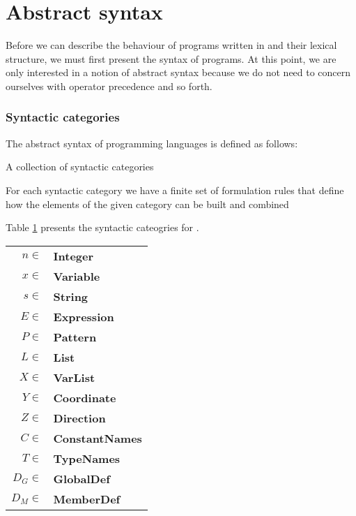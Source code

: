 \section{Abstract syntax}
\label{sec:abstractsyntax}
Before we can describe the behaviour of programs written in \productname{} and
their lexical structure, we must first present the syntax of programs. At this
point, we are only interested in a notion of abstract syntax because we do not
need to concern ourselves with operator precedence and so forth.

\subsubsection{Syntactic categories}
The abstract syntax of programming languages is defined as follows\cite[p.
27]{tt-hh}:

\begin{dlist}
  \item A collection of syntactic categories
  \item For each syntactic category we have a finite set of formulation rules
    that define how the elements of the given category can be built and combined
\end{dlist}

Table \ref{table:syn-cat} presents the syntactic cateogries for \productname{}.

\begin{table}[ht]
  \begin{center}
    \begin{tabular}{rl}
      \hline
      $n \in$ & \textbf{Integer}         \\
      $x \in$ & \textbf{Variable}        \\
      $s \in$ & \textbf{String}          \\
      $E \in$ & \textbf{Expression}      \\
      $P \in$ & \textbf{Pattern}         \\
      $L \in$ & \textbf{List}            \\
      $X \in$ & \textbf{VarList}         \\
      $Y \in$ & \textbf{Coordinate}      \\
      $Z \in$ & \textbf{Direction}       \\
      $C \in$ & \textbf{ConstantNames}   \\
      $T \in$ & \textbf{TypeNames}       \\
      $D_{G} \in$ & \textbf{GlobalDef}   \\
      $D_{M} \in$ & \textbf{MemberDef}   \\
      \hline
    \end{tabular}  
    \label{table:syn-cat}
  \end{center}
\end{table}

